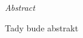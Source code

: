 \vfill
\begin{center}
{\it \large Abstract}
\vspace{0.2cm}

\begin{minipage}{0.8\textwidth}{
Tady bude abstrakt
}
\end{minipage}
\end{center}
\vfill
\vspace{1cm}
